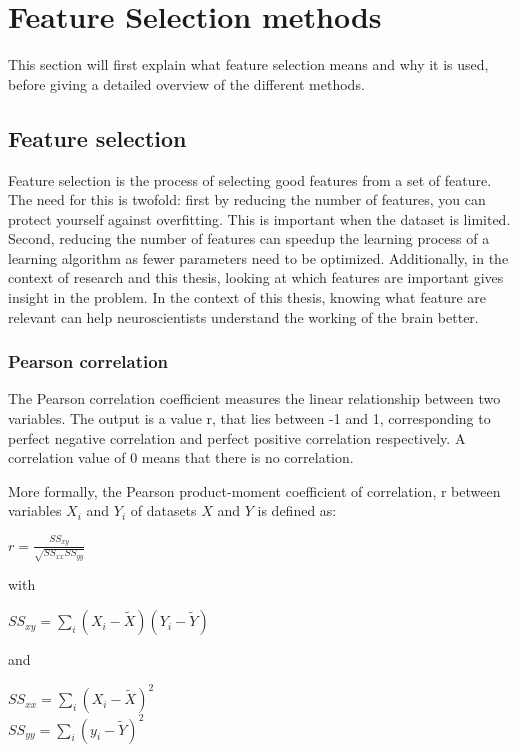 \chapter{Feature Selection methods}
{\samenvatting This section will first explain what feature selection means and why it is used, before giving a detailed overview of the different methods.}

\section{Feature selection}
Feature selection is the process of selecting good features from a set of feature. The need for this is twofold: first by reducing the number of features, you can protect yourself against overfitting. This is important when the dataset is limited. Second, reducing the number of features can speedup the learning process of a learning algorithm as fewer parameters need to be optimized. Additionally, in the context of research and this thesis, looking at which features are important gives insight in the problem. In the context of this thesis, knowing what feature are relevant can help neuroscientists understand the working of the brain better.

\subsection{Pearson correlation}
The Pearson correlation coefficient measures the linear relationship between two variables. The output is a value r, that lies between -1 and 1, corresponding to perfect negative correlation and perfect positive correlation respectively. A correlation value of 0 means that there is no correlation.

\npar

More formally\citep{corrPaper}, the Pearson product-moment coefficient of correlation, r between variables $X_i$ and $Y_i$ of datasets $X$ and $Y$ is defined as:


\begin{center}
$r = \frac{SS_{xy}}{\sqrt{SS_{xx}SS_{yy}}}$
\end{center}
with
\begin{center}
$SS_{xy} = \sum\limits_i (X_i-\tilde{X})(Y_i-\tilde{Y})$
\end{center}
and
\begin{center}
$SS_{xx} = \sum\limits_i (X_i-\tilde{X})^2$ \\
$SS_{yy} = \sum\limits_i (y_i-\tilde{Y})^2$
\end{center}

